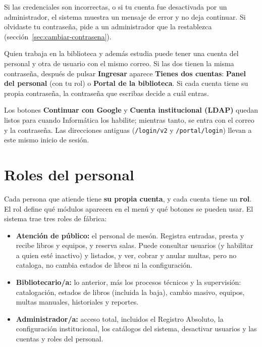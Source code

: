 \documentclass[11pt,a4paper]{report}
\begin{document}
Si las credenciales son incorrectas, o si tu cuenta fue desactivada por un
administrador, el sistema muestra un mensaje de error y no deja continuar.
Si olvidaste tu contraseña, pide a un administrador que la restablezca
(sección~\ref{sec:cambiar-contrasena}).

Quien trabaja en la biblioteca y además estudia puede tener una cuenta del
personal y otra de usuario con el mismo correo. Si las dos tienen la misma
contraseña, después de pulsar \textbf{Ingresar} aparece \textbf{Tienes dos
cuentas}: \textbf{Panel del personal} (con tu rol) o \textbf{Portal de la
biblioteca}. Si cada cuenta tiene su propia contraseña, la contraseña que
escribas decide a cuál entras.


\begin{nota}
Los botones \textbf{Continuar con Google} y \textbf{Cuenta institucional
(LDAP)} quedan listos para cuando Informática los habilite; mientras tanto,
se entra con el correo y la contraseña. Las direcciones antiguas
(\texttt{/login/v2} y \texttt{/portal/login}) llevan a este mismo inicio
de sesión.
\end{nota}

\section{Roles del personal}
\label{sec:roles}

Cada persona que atiende tiene \textbf{su propia cuenta}, y cada cuenta
tiene un \textbf{rol}. El rol define qué módulos aparecen en el menú y qué
botones se pueden usar. El sistema trae tres roles de fábrica:

\begin{itemize}
  \item \textbf{Atención de público:} el personal de mesón. Registra
  entradas, presta y recibe libros y equipos, y reserva salas. Puede
  consultar usuarios (y habilitar a quien esté inactivo) y listados, y
  ver, cobrar y anular multas, pero no cataloga, no cambia estados de
  libros ni la configuración.
  \item \textbf{Bibliotecario/a:} lo anterior, más los procesos técnicos y
  la supervisión: catalogación, estados de libros (incluida la baja),
  cambio masivo, equipos, multas manuales, historiales y reportes.
  \item \textbf{Administrador/a:} acceso total, incluidos el Registro
  Absoluto, la configuración institucional, los catálogos del sistema,
  desactivar usuarios y las cuentas y roles del personal.
\end{itemize}
\end{document}
